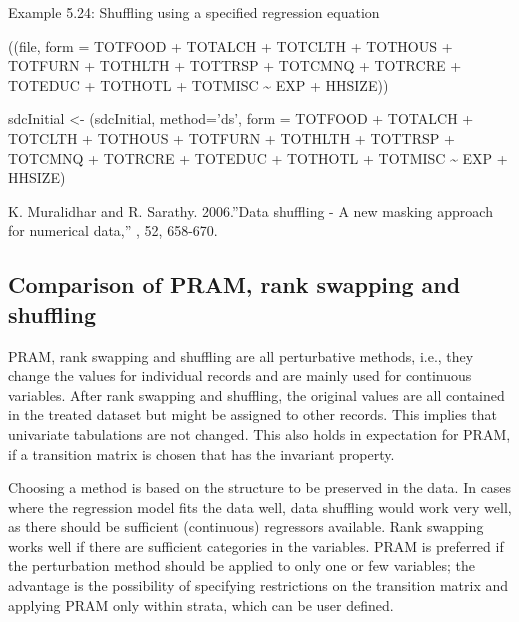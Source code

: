 \documentclass[letterpaper,10pt,english]{sphinxmanual}
\begin{document}
Example 5.24: Shuffling using a specified regression equation

\begin{DUlineblock}{0em}
\item[] 
\item[] ((file, form = TOTFOOD + TOTALCH + TOTCLTH +
TOTHOUS + TOTFURN + TOTHLTH + TOTTRSP + TOTCMNQ + TOTRCRE + TOTEDUC +
TOTHOTL + TOTMISC \textasciitilde{} EXP + HHSIZE))
\end{DUlineblock}

\begin{DUlineblock}{0em}
\item[] 
\item[] sdcInitial \textless{}- (sdcInitial, method=’ds’, form = TOTFOOD +
TOTALCH + TOTCLTH + TOTHOUS + TOTFURN + TOTHLTH + TOTTRSP + TOTCMNQ +
TOTRCRE + TOTEDUC + TOTHOTL + TOTMISC \textasciitilde{} EXP + HHSIZE)
\end{DUlineblock}


K. Muralidhar and R. Sarathy. 2006.”Data shuffling - A new masking
approach for numerical data,” , 52, 658-670.


\subsection{Comparison of PRAM, rank swapping and shuffling}
\label{\detokenize{anon_methods:comparison-of-pram-rank-swapping-and-shuffling}}
PRAM, rank swapping and shuffling are all perturbative methods, i.e.,
they change the values for individual records and are mainly used for
continuous variables. After rank swapping and shuffling, the original
values are all contained in the treated dataset but might be assigned to
other records. This implies that univariate tabulations are not changed.
This also holds in expectation for PRAM, if a transition matrix is
chosen that has the invariant property.

Choosing a method is based on the structure to be preserved in the data.
In cases where the regression model fits the data well, data shuffling
would work very well, as there should be sufficient (continuous)
regressors available. Rank swapping works well if there are sufficient
categories in the variables. PRAM is preferred if the perturbation
method should be applied to only one or few variables; the advantage is
the possibility of specifying restrictions on the transition matrix and
applying PRAM only within strata, which can be user defined.
\end{document}
